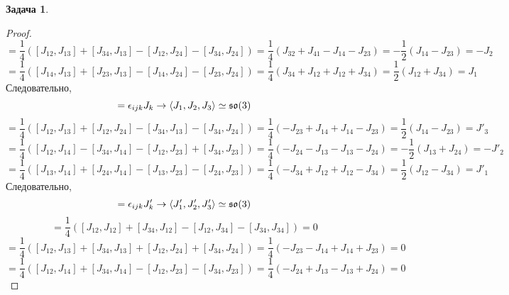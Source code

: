 \documentclass[12pt]{article}
\theoremstyle{definition}
\newtheorem{zad}{Задача}[section]
\begin{document}
\begin{zad}
\begin{itemize}
\begin{proof}
\begin{equation*}
            [J_1,J_3]=\frac{1}{4}([J_{12},J_{13}]+[J_{34},J_{13}]-[J_{12},J_{24}]-[J_{34},J_{24}])=\frac{1}{4}(J_{32}+J_{41}-J_{14}-J_{23})=-\frac{1}{2}(J_{14}-J_{23})=-J_2
        \end{equation*}
        \begin{equation*}
            [J_2,J_3]=\frac{1}{4}([J_{14},J_{13}]+[J_{23},J_{13}]-[J_{14},J_{24}]-[J_{23},J_{24}])=\frac{1}{4}(J_{34}+J_{12}+J_{12}+J_{34})=\frac{1}{2}(J_{12}+J_{34})=J_1
        \end{equation*}
        Следовательно,
        \begin{equation}
            [J_i,J_j]=\epsilon_{ijk}J_k\rightarrow \braket{J_1,J_2,J_3}\simeq\mathfrak{so}(3)
        \end{equation}
        \begin{equation*}
            [J'_1,J'_2]=\frac{1}{4}([J_{12},J_{13}]+[J_{12},J_{24}]-[J_{34},J_{13}]-[J_{34},J_{24}])=\frac{1}{4}(-J_{23}+J_{14}+J_{14}-J_{23})=\frac{1}{2}(J_{14}-J_{23})=J'_3
        \end{equation*}
        \begin{equation*}
            [J'_1,J'_3]=\frac{1}{4}([J_{12},J_{14}]-[J_{34},J_{14}]-[J_{12},J_{23}]+[J_{34},J_{23}])=\frac{1}{4}(-J_{24}-J_{13}-J_{13}-J_{24})=-\frac{1}{2}(J_{13}+J_{24})=-J'_2
        \end{equation*}
        \begin{equation*}
            [J'_2,J'_3]=\frac{1}{4}([J_{13},J_{14}]+[J_{24},J_{14}]-[J_{13},J_{23}]-[J_{24},J_{23}])=\frac{1}{4}(-J_{34}+J_{12}+J_{12}-J_{34})=\frac{1}{2}(J_{12}-J_{34})=J'_1
        \end{equation*}
        Следовательно,
        \begin{equation}
            [J'_i,J'_j]=\epsilon_{ijk}J'_k\rightarrow \braket{J'_1,J'_2,J'_3}\simeq\mathfrak{so}(3)
        \end{equation}
        \begin{equation*}
            [J_1,J'_1]=\frac{1}{4}([J_{12},J_{12}]+[J_{34},J_{12}]-[J_{12},J_{34}]-[J_{34},J_{34}])=0
        \end{equation*}
        \begin{equation*}
            [J_1,J'_2]=\frac{1}{4}([J_{12},J_{13}]+[J_{34},J_{13}]+[J_{12},J_{24}]+[J_{34},J_{24}])=\frac{1}{4}(-J_{23}-J_{14}+J_{14}+J_{23})=0
        \end{equation*}
        \begin{equation*}
            [J_1,J'_3]=\frac{1}{4}([J_{12},J_{14}]+[J_{34},J_{14}]-[J_{12},J_{23}]-[J_{34},J_{23}])=\frac{1}{4}(-J_{24}+J_{13}-J_{13}+J_{24})=0

\end{equation*}
\end{proof}
\end{itemize}
\end{zad}
\end{document}
